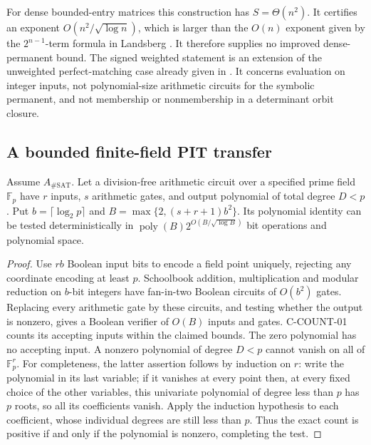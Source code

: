 For dense bounded-entry matrices this construction has \(S=\Theta(n^2)\).
It certifies an exponent \(O(n^2/\sqrt{\log n})\), which is larger
than the \(O(n)\) exponent given by the \(2^{n-1}\)-term formula in
Landsberg \cite[\S8.2, equation~(22)]{CLandsberg13}.
It therefore supplies no improved dense-permanent bound.
The signed weighted statement is an extension of the unweighted
perfect-matching case already given in \cite[Corollary~1.3]{COAI26}.
It concerns evaluation on integer inputs, not polynomial-size
arithmetic circuits for the symbolic permanent, and not membership
or nonmembership in a determinant orbit closure.

\subsection{A bounded finite-field PIT transfer}

\begin{proposition}[C-PIT-01]
Assume \(A_{\#\mathrm{SAT}}\).  Let a division-free arithmetic circuit
over a specified prime field \(\mathbb F_p\) have \(r\) inputs,
\(s\) arithmetic gates, and output polynomial of total degree \(D<p\).
Put \(b=\lceil\log_2 p\rceil\) and
\(B=\max\{2,(s+r+1)b^2\}\).  Its polynomial identity can be tested
deterministically in \(\operatorname{poly}(B)2^{O(B/\sqrt{\log B})}\)
bit operations and polynomial space.
\end{proposition}
\begin{proof}
Use \(rb\) Boolean input bits to encode a field point uniquely, rejecting
any coordinate encoding at least \(p\).  Schoolbook addition,
multiplication and modular reduction on \(b\)-bit integers have
fan-in-two Boolean circuits of \(O(b^2)\) gates.  Replacing every
arithmetic gate by these circuits, and testing whether the output is
nonzero, gives a Boolean verifier of \(O(B)\) inputs and gates.
C-COUNT-01 counts its accepting inputs within the claimed bounds.
The zero polynomial has no accepting input.  A nonzero polynomial
of degree \(D<p\) cannot vanish on all of \(\mathbb F_p^r\).
For completeness, the latter assertion follows by induction on \(r\):
write the polynomial in its last variable; if it vanishes at every
point then, at every fixed choice of the other variables, this
univariate polynomial of degree less than \(p\) has \(p\) roots,
so all its coefficients vanish.  Apply the induction hypothesis to
each coefficient, whose individual degrees are still less than \(p\).
Thus the exact count is positive if and only if the polynomial is
nonzero, completing the test.
\end{proof}

